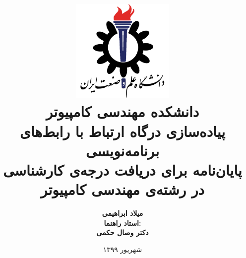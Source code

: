 \title{
    \center
    \includegraphics[width=5cm, height=5cm]{images/IUST_logo_color.png} \\ [10pt]
    دانشکده مهندسی کامپیوتر \\ [40pt]

    \textbf{ پیاده‌سازی درگاه ارتباط با رابط‌های برنامه‌نویسی} \\ [20pt]

    \textbf{ پایان‌نامه برای دریافت درجه‌ی کارشناسی در رشته‌ی مهندسی کامپیوتر} \\ [20pt]

}

\author{
    \textbf{میلاد ابراهیمی} \\ [30pt]


    \textbf{ استاد راهنما:} \\ [10pt]
    \textbf{دکتر وصال حکمی} \\ [10pt]
}



\date{
    شهریور ۱۳۹۹
}

